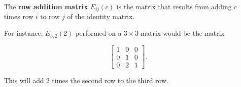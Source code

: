 \documentclass{ximera}
\begin{document}
  \begin{definition}
    The \textbf{row addition matrix} $E_{ij}(c)$ is the matrix that results from adding $c$ times row $i$ to row $j$ of the identity matrix.

    For instance, $E_{3,2}(2)$ performed on a $3\times 3$ matrix would be the matrix

    \begin{equation*}
      \begin{bmatrix}
        1 & 0 & 0 \\
        0 & 1 & 0 \\
        0 & 2 & 1
      \end{bmatrix}.
    \end{equation*}

    This will add $2$ times the second row to the third row.
  \end{definition}
\end{document}
